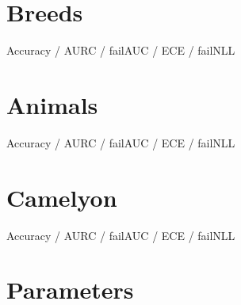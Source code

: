 \documentclass{article}
\begin{document}
    
    \pagebreak

    \section{Breeds}
    Accuracy / AURC / failAUC / ECE / failNLL

    
    \pagebreak

    \section{Animals}
    Accuracy / AURC / failAUC / ECE / failNLL

    
    \pagebreak

    
    \pagebreak

    \section{Camelyon}
    Accuracy / AURC / failAUC / ECE / failNLL

    

    \section{Parameters}
    

    
\end{document}
